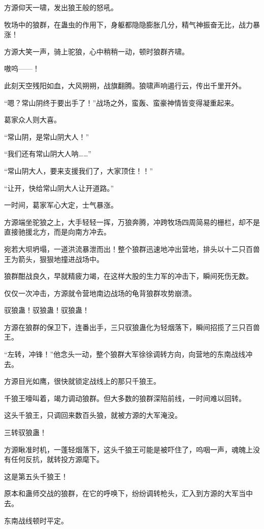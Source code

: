 \begin{this_body}
方源仰天一啸，发出狼王般的怒吼。

牧场中的狼群，在蛊虫的作用下，身躯都隐隐膨胀几分，精气神振奋无比，战力暴涨！

方源大笑一声，骑上驼狼，心中稍稍一动，顿时狼群齐啸。

嗷呜——！

此刻天空残阳如血，大风朔朔，战旗翻腾。狼啸声响遏行云，传出千里开外。

“嗯？常山阴终于要出手了！”战场之外，蛮轰、蛮豪神情皆变得凝重起来。

葛家众人则大喜。

“常山阴，是常山阴大人！”

“我们还有常山阴大人呐……”

“常山阴大人，要来支援我们了，大家顶住！！”

“让开，快给常山阴大人让开道路。”

一时间，葛家军心大定，士气暴涨。

方源端坐驼狼之上，大手轻轻一挥，万狼奔腾，冲跨牧场四周简易的栅栏，却不是直接驰援北方，而是向南方冲去。

宛若大坝坍塌，一道洪流暴泄而出！整个狼群迅速地冲出营地，排头以十二只百兽王为箭头，狠狠地撞进战场中。

狼群酣战良久，早就精疲力竭，在这样大股的生力军的冲击下，瞬间死伤无数。

仅仅一次冲击，方源就令营地南边战场的龟背狼群攻势崩溃。

驭狼蛊！驭狼蛊！驭狼蛊！

方源在狼群的保卫下，连番出手，三只驭狼蛊化为轻烟落下，瞬间招揽了三只百兽王。

“左转，冲锋！”他念头一动，整个狼群大军徐徐调转方向，向营地的东南战线冲去。

方源目光如鹰，很快就锁定战线上的那只千狼王。

千狼王嚎叫着，竭力调动狼群。但大多数的狼群深陷前线，一时间难以回转。

这头千狼王，只调回来数百头狼，就被方源的大军淹没。

三转驭狼蛊！

方源瞅准时机，一蓬轻烟落下，这头千狼王可能是被吓住了，呜咽一声，魂魄上没有任何反抗，就转投方源麾下。

这是第五头千狼王！

原本和蛊师交战的狼群，在它的呼唤下，纷纷调转枪头，汇入到方源的大军当中去。

东南战线顿时平定。

\end{this_body}

